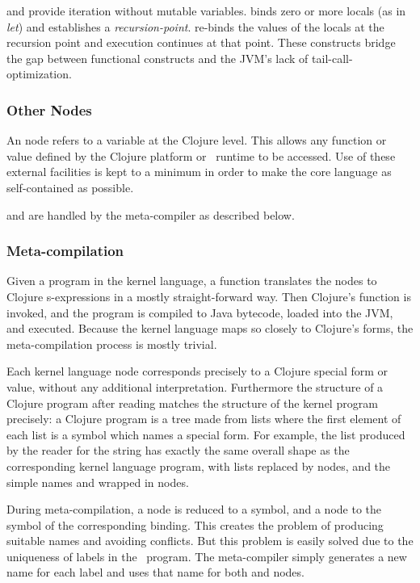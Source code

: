  and  provide iteration without mutable variables.  binds zero or more locals (as in \emph{let}) and establishes a \emph{recursion-point}.  re-binds the values of the locals at the recursion point and execution continues at that point. These constructs bridge the gap between functional constructs and the JVM's lack of tail-call-optimization. 

\subsubsection{Other Nodes}
An  node refers to a variable at the Clojure level. This allows any function or value defined by the Clojure platform or \Meta\ runtime to be accessed. Use of these external facilities is kept to a minimum in order to make the core language as self-contained as possible. 

 and  are handled by the meta-compiler as described below.

\subsubsection{Meta-compilation}
Given a program in the kernel language, a function  translates the nodes to Clojure s-expressions in a mostly straight-forward way. Then Clojure's  function is invoked, and the program is compiled to Java bytecode, loaded into the JVM, and executed. Because the kernel language maps so closely to Clojure's forms, the meta-compilation process is mostly trivial.

Each kernel language node corresponds precisely to a Clojure special form or value, without any additional interpretation. Furthermore the structure of a Clojure program after reading matches the structure of the kernel program precisely: a Clojure program is a tree made from lists where the first element of each list is a symbol which names a special form. For example, the list produced by the reader for the string  has exactly the same overall shape as the corresponding kernel language program, with lists replaced by  nodes, and the simple names \clojure{*} and \clojure{+} wrapped in  nodes. 

During meta-compilation, a  node is reduced to a symbol, and a  node to the symbol of the corresponding binding. This creates the problem of producing suitable names and avoiding conflicts. But this problem is easily solved due to the uniqueness of labels in the \Meta\ program. The meta-compiler simply generates a new name for each label and uses that name for both  and  nodes.

